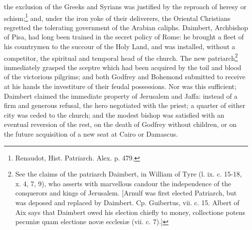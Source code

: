the exclusion of the Greeks and Syrians was justified by the reproach of heresy or schism;\footnote{Renaudot, Hist. Patriarch. Alex. p. 479.} and, under the iron yoke of their deliverers, the Oriental Christians regretted the tolerating government of the Arabian caliphs. Daimbert, Archbishop of Pisa, had long been trained in the secret policy of Rome: he brought a fleet of his countrymen to the succour of the Holy Land, and was installed, without a competitor, the spiritual and temporal head of the church. The new patriarch\footnote{See the claims of the patriarch Daimbert, in William of Tyre (l. ix. c. 15-18, x. 4, 7, 9), who asserts with marvellous candour the independence of the conquerors and kings of Jerusalem. [Arnulf was first elected Patriarch, but was deposed and replaced by Daimbert. Cp. Guibertus, vii. c. 15. Albert of Aix says that Daimbert owed his election chiefly to money, collectione potens pecuniæ quam electione novæ ecclesiæ (vii. c. 7).]} immediately grasped the sceptre which had been acquired by the toil and blood of the victorious pilgrims; and both Godfrey and Bohemond submitted to receive at his hands the investiture of their feudal possessions. Nor was this sufficient; Daimbert claimed the immediate property of Jerusalem and Jaffa: instead of a firm and generous refusal, the hero negotiated with the priest; a quarter of either city was ceded to the church; and the modest bishop was satisfied with an eventual reversion of the rest, on the death of Godfrey without children, or on the future acquisition of a new seat at Cairo or Damascus.

